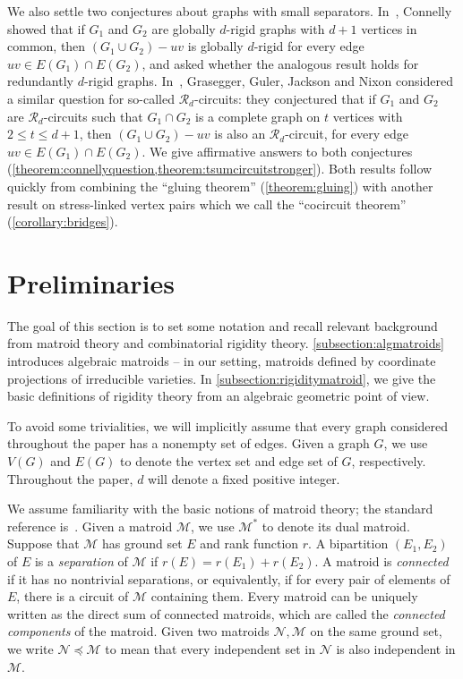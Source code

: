 \documentclass[11pt,a4paper,dvipsnames]{scrartcl}
\theoremstyle{definition}
\newcommand{\globrig}[1]{globally $#1$-rigid}
\newcommand{\rig}[1]{$#1$-rigid}
\begin{document}
We also settle two conjectures about graphs with small separators. In~\cite{connelly_2011a}, Connelly showed that if $G_1$ and $G_2$ are \globrig{d} graphs with $d+1$ vertices in common, then $(G_1 \cup G_2) - uv$ is \globrig{d} for every edge $uv \in E(G_1) \cap E(G_2)$, and asked whether the analogous result holds for redundantly \rig{d} graphs. In~\cite{grasegger.etal_2022}, Grasegger, Guler, Jackson and Nixon considered a similar question for so-called $\mathcal{R}_d$-circuits: they conjectured that if $G_1$ and $G_2$ are $\mathcal{R}_d$-circuits such that $G_1 \cap G_2$ is a complete graph on $t$ vertices with $2 \leq t \leq d+1$, then $(G_1 \cup G_2) - uv$ is also an $\mathcal{R}_d$-circuit, for every edge $uv \in E(G_1) \cap E(G_2)$. We give affirmative answers to both conjectures (\cref{theorem:connellyquestion,theorem:tsumcircuitstronger}). Both results follow quickly from combining the ``gluing theorem'' (\cref{theorem:gluing}) with another result on stress-linked vertex pairs which we call the ``cocircuit theorem'' (\cref{corollary:bridges}).  %


\section{Preliminaries}\label{section:preliminaries}

The goal of this section is to set some notation and recall relevant background from matroid theory and combinatorial rigidity theory. \cref{subsection:algmatroids} introduces algebraic matroids -- in our setting, matroids defined by coordinate projections of irreducible varieties. 
In \cref{subsection:rigiditymatroid}, we give the basic definitions of rigidity theory from an algebraic geometric point of view. 


To avoid some trivialities, we will implicitly assume that every graph considered throughout the paper has a nonempty set of edges. Given a graph $G$, we use $V(G)$ and $E(G)$ to denote the vertex set and edge set of $G$, respectively. Throughout the paper, $d$ will denote a fixed positive integer.

We assume familiarity with the basic notions of matroid theory; the standard reference is~\cite{oxley_2011}. Given a matroid $\mathcal{M}$, we use $\mathcal{M}^*$ to denote its dual matroid.
Suppose that $\mathcal{M}$ has ground set $E$ and rank function $r$. A bipartition $(E_1,E_2)$ of $E$ is a \emph{separation} of $\mathcal{M}$ if $r(E) = r(E_1) + r(E_2)$. A matroid is \emph{connected} if it has no nontrivial separations, or equivalently, if for every pair of elements of $E$, there is a circuit of $\mathcal{M}$ containing them. Every matroid can be uniquely written as the direct sum of connected matroids, which are called the \emph{connected components} of the matroid. Given two matroids $\mathcal{N},\mathcal{M}$ on the same ground set, we write $\mathcal{N} \preceq \mathcal{M}$ to mean that every independent set in $\mathcal{N}$ is also independent in $\mathcal{M}$.
\end{document}
